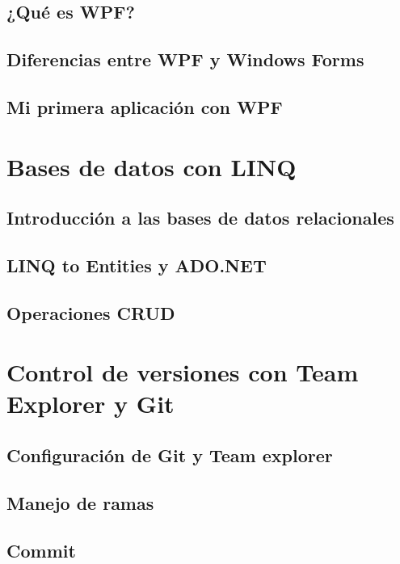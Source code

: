 \documentclass[12pt,a4paper]{report}
\begin{document}
\section{¿Qué es WPF?}
\section{Diferencias entre WPF y Windows Forms}
\section{Mi primera aplicación con WPF}

\chapter{Bases de datos con LINQ}
\section{Introducción a las bases de datos relacionales}
\section{LINQ to Entities y ADO.NET}
\section{Operaciones CRUD}

\chapter{Control de versiones con Team Explorer y Git}
\section{Configuración de Git y Team explorer}
\section{Manejo de ramas}
\section{Commit}
\end{document}
